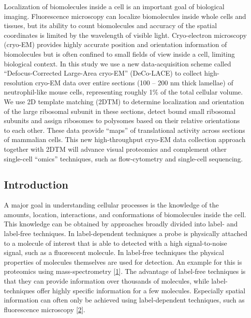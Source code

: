 \documentclass[
]{article}
\begin{document}
Localization of biomolecules inside a cell is an important goal of biological
imaging. Fluorescence microscopy can localize biomolecules inside whole cells
and tissues, but its ability to count biomolecules and accuracy of the spatial
coordinates is limited by the wavelength of visible light. Cryo-electron
microscopy (cryo-EM) provides highly accurate position and orientation
information of biomolecules but is often confined to small fields of view inside
a cell, limiting biological context. In this study we use a new data-acquisition
scheme called ``Defocus-Corrected Large-Area cryo-EM'' (DeCo-LACE) to collect
high-resolution cryo-EM data over entire sections (100 -- 200 nm thick lamellae)
of neutrophil-like mouse cells, representing roughly 1\% of the total cellular
volume. We use 2D template matching (2DTM) to determine localization and orientation
of the large ribosomal subunit in these sections, detect bound small
ribosomal subunits and assign ribosomes to polysomes based on their relative orientations to each other. These data provide ``maps'' of translational activity across
sections of mammalian cells. This new high-throughput cryo-EM
data collection approach together with 2DTM will advance visual
proteomics and complement other single-cell ``omics'' techniques, such as
flow-cytometry and single-cell sequencing.

\hypertarget{introduction}{%
\subsection{Introduction}\label{introduction}}

A major goal in understanding cellular processes is the knowledge of the
amounts, location, interactions, and conformations of biomolecules
inside the cell. This knowledge can be obtained by approaches broadly
divided into label- and label-free techniques. In label-dependent
techniques a probe is physically attached to a molecule of interest that
is able to detected with a high signal-to-noise signal, such as a
fluorescent molecule. In label-free techniques the physical properties
of molecules themselves are used for detection. An example for this is
proteomics using mass-spectrometry {[}\protect\hyperlink{ref-tSXIKPl7}{1}{]}. The advantage
of label-free techniques is that they can provide information over
thousands of molecules, while label-techniques offer highly specific
information for a few molecules. Especially spatial information can
often only be achieved using label-dependent techniques, such as
fluorescence microscopy {[}\protect\hyperlink{ref-VBmW7Aot}{2}{]}.
\end{document}
